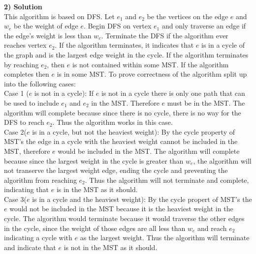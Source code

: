 \documentclass[11pt]{article}
\begin{document}
\textbf{2) Solution}\\
This algorithm is based on DFS. Let $e_1$ and $e_2$ be the vertices on the edge $e$ and $w_e$ be the weight of edge $e$. Begin DFS on vertex $e_1$ and only traverse an edge if the edge's weight is less than $w_e$. Terminate the DFS if the algorithm ever reaches vertex $e_2$. If the algorithm terminates, it indicates that $e$ is in a cycle of the graph and is the largest edge weight in the cycle. If the algorithm terminates by reaching $e_2$, then $e$ is not contained within some MST. If the algorithm completes then $e$ is in some MST. To prove correctness of the algorithm split up into the following cases:\\
Case 1 ($e$ is not in a cycle): If $e$ is not in a cycle there is only one path that can be used to include $e_1$ and $e_2$ in the MST. Therefore $e$ must be in the MST. The algorithm will complete because since there is no cycle, there is no way for the DFS to reach $e_2$. Thus the algorithm works in this case.\\
Case 2($e$ is in a cycle, but not the heaviest weight): By the cycle property of MST's the edge in a cycle with the heaviest weight cannot be included in the MST, therefore $e$ would be included in the MST. The algorithm will complete because since the largest weight in the cycle is greater than $w_e$, the algorithm will not transerve the largest weight edge, ending the cycle and preventing the algorithm from reaching $e_2$. Thus the algorithm will not terminate and complete, indicating that $e$ is in the MST as it should.\\
Case 3($e$ is in a cycle and the heaviest weight): By the cycle propert of MST's the $e$ would not be included in the MST because it is the heaviest weight in the cycle. The algorithm would terminate because it would traverse the other edges in the cycle, since the weight of those edges are all less than $w_e$ and reach $e_2$ indicating a cycle with $e$ as the largest weight. Thus the algorithm will terminate and indicate that $e$ is not in the MST as it should.\\
\end{document}
